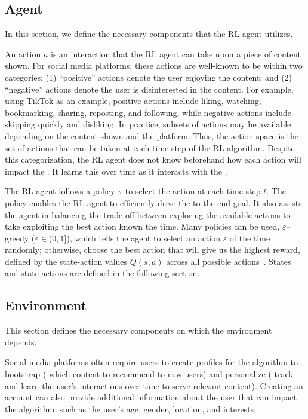 \subsection{Agent}
\label{sec:agent-framework}
In this section, we define the necessary components that the RL agent utilizes.

An action $a$ is an interaction that the RL agent can take upon a piece of content shown. 
For social media platforms, these actions are well-known to be within two categories: (1) ``positive'' actions denote the user enjoying the content; and (2) ``negative'' actions denote the user is disinterested in the content. 
For example, using TikTok as an example, positive actions include liking, watching, bookmarking, sharing, reposting, and following, while negative actions include skipping quickly and disliking.
In practice, subsets of actions may be available depending on the content shown and the platform. Thus, the action space is the set of actions that can be taken at each time step of the RL algorithm.
Despite this categorization, the RL agent does not know beforehand how each action will impact the \rs{}. It learns this over time as it interacts with the \fyp{}.


The RL agent follows a policy $\pi$ to select the action at each time step $t$. The policy enables the RL agent to efficiently drive the \rs{} to the end goal. 
It also assists the agent in balancing the trade-off between exploring the available actions to take \vs exploiting the best action known the time. Many policies can be used, \eg{}
 $\varepsilon$--greedy ($\varepsilon \in (0,1]$), which tells the agent to select an action $\varepsilon$ of the time randomly; otherwise, choose the best action that will give us the highest reward, defined by the state-action values $Q(s, a)$ across all possible actions~\cite{sutton2018reinforcement}. %
 States and state-actions are defined in the following section.
 
\subsection{Environment}
\label{sec:env-framework}

This section defines the necessary components on which the environment depends.

Social media platforms often require users to create profiles for the algorithm to bootstrap (\ie{} which content to recommend to new users) and personalize (\ie{} track and learn the user's interactions over time to serve relevant content). Creating an account can also provide additional information about the user that can impact the algorithm, such as the user's age, gender, location, and interests. 



